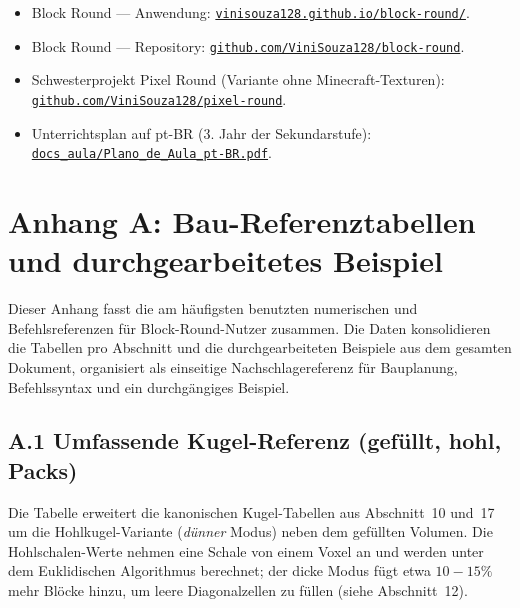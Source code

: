 \documentclass[12pt,a4paper]{scrartcl}
\newcommand{\biblink}[2]{\href{#1}{\nolinkurl{#2}}}
\begin{document}
\begin{itemize}[leftmargin=1.4em,itemsep=0.3em,topsep=0.3em]
  \item Block Round --- Anwendung: \biblink{https://vinisouza128.github.io/block-round/}{vinisouza128.github.io/block-round/}.
  \item Block Round --- Repository: \biblink{https://github.com/ViniSouza128/block-round}{github.com/ViniSouza128/block-round}.
  \item Schwesterprojekt Pixel Round (Variante ohne Minecraft-Texturen):
        \biblink{https://github.com/ViniSouza128/pixel-round}{github.com/ViniSouza128/pixel-round}.
  \item Unterrichtsplan auf pt-BR (3. Jahr der Sekundarstufe):
        \biblink{https://vinisouza128.github.io/block-round/docs_aula/Plano_de_Aula_pt-BR.pdf}{docs\_aula/Plano\_de\_Aula\_pt-BR.pdf}.
\end{itemize}


\clearpage

\section*{\color{accent}Anhang A: Bau-Referenztabellen und durchgearbeitetes Beispiel}

Dieser Anhang fasst die am häufigsten benutzten numerischen und Befehlsreferenzen für Block-Round-Nutzer zusammen. Die Daten konsolidieren die Tabellen pro Abschnitt und die durchgearbeiteten Beispiele aus dem gesamten Dokument, organisiert als einseitige Nachschlagereferenz für Bauplanung, Befehlssyntax und ein durchgängiges Beispiel.

\subsection*{A.1 Umfassende Kugel-Referenz (gefüllt, hohl, Packs)}
Die Tabelle erweitert die kanonischen Kugel-Tabellen aus Abschnitt~10 und~17 um die Hohlkugel-Variante (\emph{dünner} Modus) neben dem gefüllten Volumen. Die Hohlschalen-Werte nehmen eine Schale von einem Voxel an und werden unter dem Euklidischen Algorithmus berechnet; der dicke Modus fügt etwa $10{-}15\%$ mehr Blöcke hinzu, um leere Diagonalzellen zu füllen (siehe Abschnitt~12).
\end{document}
